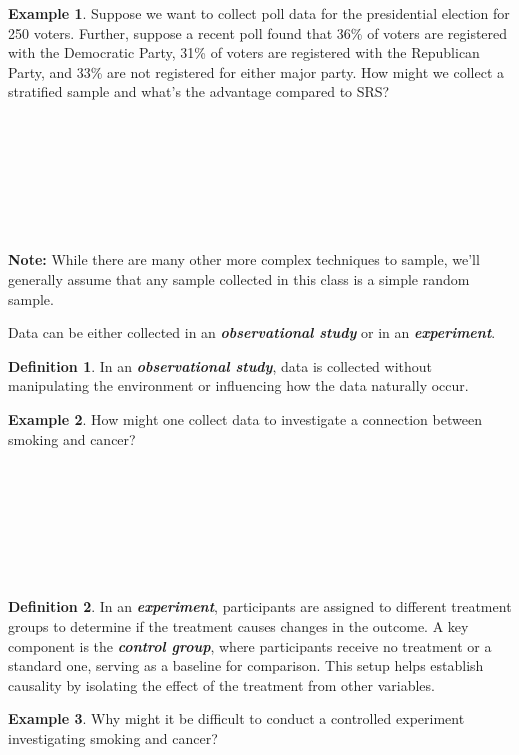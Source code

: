 \documentclass[
  11pt,
  oneside]{book}
\theoremstyle{definition}
\newtheorem{definition}{Definition}[chapter]
\theoremstyle{definition}
\newtheorem{example}{Example}[chapter]
\theoremstyle{definition}
\theoremstyle{definition}
\theoremstyle{remark}
\begin{document}
\begin{example}
Suppose we want to collect poll data for the presidential election for 250 voters. Further, suppose a recent poll found that 36\% of voters are registered with the Democratic Party, 31\% of voters are registered with the Republican Party, and 33\% are not registered for either major party. How might we collect a stratified sample and what's the advantage compared to SRS?
\end{example}

\(~\)

\(~\)

\(~\)

\(~\)

\textbf{Note:} While there are many other more complex techniques to sample, we'll generally assume that any sample collected in this class is a simple random sample.

Data can be either collected in an \textbf{\emph{observational study}} or in an \textbf{\emph{experiment}}.

\begin{definition}
In an \textbf{\emph{observational study}}, data is collected without manipulating the environment or influencing how the data naturally occur.
\end{definition}

\begin{example}
How might one collect data to investigate a connection between smoking and cancer?
\end{example}

\(~\)

\(~\)

\(~\)

\(~\)

\begin{definition}
In an \textbf{\emph{experiment}}, participants are assigned to different treatment groups to determine if the treatment causes changes in the outcome. A key component is the \textbf{\emph{control group}}, where participants receive no treatment or a standard one, serving as a baseline for comparison. This setup helps establish causality by isolating the effect of the treatment from other variables.
\end{definition}

\begin{example}
Why might it be difficult to conduct a controlled experiment investigating smoking and cancer?
\end{example}

\(~\)
\end{document}
